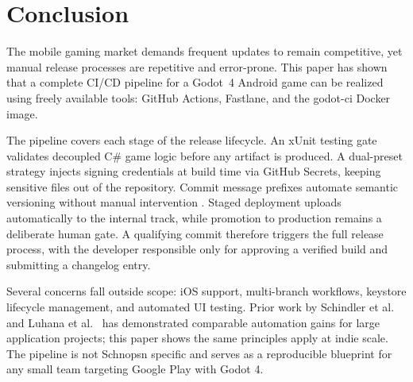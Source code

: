 \section{Conclusion}
The mobile gaming market demands frequent updates to remain competitive, yet manual release processes are repetitive and error-prone. This paper has shown that a complete CI/CD pipeline for a Godot~4 Android game can be realized using freely available tools: GitHub Actions, Fastlane, and the godot-ci Docker image.

The pipeline covers each stage of the release lifecycle. An xUnit testing gate validates decoupled C\# game logic before any artifact is produced. A dual-preset strategy injects signing credentials at build time via GitHub Secrets, keeping sensitive files out of the repository. Commit message prefixes automate semantic versioning without manual intervention \cite{b6}. Staged deployment uploads automatically to the internal track, while promotion to production remains a deliberate human gate. A qualifying commit therefore triggers the full release process, with the developer responsible only for approving a verified build and submitting a changelog entry.

Several concerns fall outside scope: iOS support, multi-branch workflows, keystore lifecycle management, and automated UI testing. Prior work by Schindler et al.\ \cite{b7} and Luhana et al.\ \cite{b8} has demonstrated comparable automation gains for large application projects; this paper shows the same principles apply at indie scale. The pipeline is not Schnopsn specific and serves as a reproducible blueprint for any small team targeting Google Play with Godot 4.
